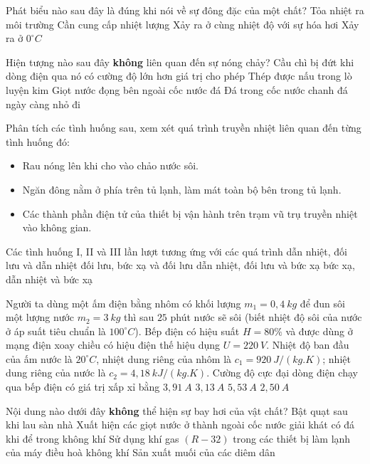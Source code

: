 \begin{ex}
	Phát biểu nào sau đây là đúng khi nói về sự đông đặc của một chất?
	\choice
	{\True Tỏa nhiệt ra môi trường}
	{Cần cung cấp nhiệt lượng}
	{Xảy ra ở cùng nhiệt độ với sự hóa hơi}
	{Xảy ra ở $0^{\circ} C$}
	\loigiai{}
\end{ex}
\begin{ex}%
	Hiện tượng nào sau đây \textbf{không} liên quan đến sự nóng chảy?
	\choice
	{Cầu chì bị đứt khi dòng điện qua nó có cường độ lớn hơn giá trị cho phép}
	{Thép được nấu trong lò luyện kim}
	{\True Giọt nước đọng bên ngoài cốc nước đá}
	{Đá trong cốc nước chanh đá ngày càng nhỏ đi}
	\loigiai{}
\end{ex}
\begin{ex}%
	Phân tích các tình huống sau, xem xét quá trình truyền nhiệt liên quan đến từng tình huống đó:
	\begin{itemize}
		\item[I. ]Rau nóng lên khi cho vào chảo nước sôi.
		\item[II. ] Ngăn đông nằm ở phía trên tủ lạnh, làm mát toàn bộ bên trong tủ lạnh.
		\item[III. ]Các thành phần điện tử của thiết bị vận hành trên trạm vũ trụ truyền nhiệt vào không gian.
	\end{itemize}
	Các tình huống I, II và III lần lượt tương ứng với các quá trình
	\choice
	{dẫn nhiệt, đối lưu và dẫn nhiệt}
	{đối lưu, bức xạ và đối lưu}
	{\True dẫn nhiệt, đối lưu và bức xạ}
	{bức xạ, dẫn nhiệt và bức xạ}
	\loigiai{}
\end{ex}
\begin{ex}
	Người ta dùng một ấm điện bằng nhôm có khối lượng $m_1=0,4\ kg$ để đun sôi một lượng nước $m_2=3\ kg$ thì sau $25$ phút nước sẽ sôi (biết nhiệt độ sôi của nước ở áp suất tiêu chuẩn là $100^{\circ} C$). Bếp điện có hiệu suất $H=80 \%$ và được dùng ở mạng điện xoay chiều có hiệu điện thế hiệu dụng $U=220\ V$. Nhiệt độ ban đầu của ấm nước là $20^{\circ} C$, nhiệt dung riêng của nhôm là $c_1=920\ J/(kg.K)$; nhiệt dung riêng của nước là $c_2=4,18\ kJ /(kg.K)$. Cường độ cực đại dòng điện chạy qua bếp điện có giá trị xấp xỉ bằng
	\choice
	{$3,91\ A$}
	{$3,13\ A$}
	{\True $5,53\ A$}
	{$2,50\ A$}
	\loigiai{}
\end{ex}
\begin{ex}%
	Nội dung nào dưới đây \textbf{không} thể hiện sự bay hơi của vật chất?
	\choice
	{Bật quạt sau khi lau sàn nhà}
	{\True Xuất hiện các giọt nước ở thành ngoài cốc nước giải khát có đá khi để trong không khí}
	{Sử dụng khí gas $(R-32)$ trong các thiết bị làm lạnh của máy điều hoà không khí}
	{Sản xuất muối của các diêm dân}
	\loigiai{}
\end{ex}
